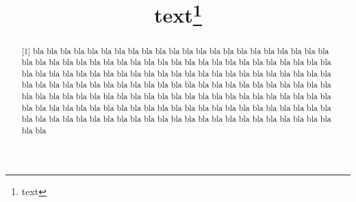 \documentclass[%
  english,ngerman,%
  ddcfoot=color,%
  cdhead=bicolor,
  cd=color,%
  cdgeometry=no,
  abstract=no,
]%
{tudscrartcl}
\begin{document}

\makeatletter
{}
\title{text\thanks{text}}
\maketitle

\begin{abstract}[1]
bla bla bla bla bla bla bla bla bla bla bla bla bla bla bla bla bla bla 
bla bla bla bla bla bla bla bla bla bla bla bla bla bla bla bla bla bla 
bla bla bla bla bla bla bla bla bla bla bla bla bla bla bla bla bla bla 
\nextabstract%
bla bla bla bla bla bla bla bla bla bla bla bla bla bla bla bla bla bla 
bla bla bla bla bla bla bla bla bla bla bla bla bla bla bla bla bla bla 
bla bla bla bla bla bla bla bla bla bla bla bla bla bla bla bla bla bla 
\nextabstract%
bla bla bla bla bla bla bla bla bla bla bla bla bla bla bla bla bla bla 
bla bla bla bla bla bla bla bla bla bla bla bla bla bla bla bla bla bla 
bla bla bla bla bla bla bla bla bla bla bla bla bla bla bla bla bla bla 
\end{abstract}
\blindtext
\end{document}
